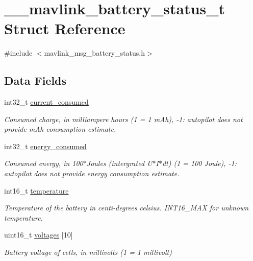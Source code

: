 \hypertarget{struct____mavlink__battery__status__t}{\section{\+\_\+\+\_\+mavlink\+\_\+battery\+\_\+status\+\_\+t Struct Reference}
\label{struct____mavlink__battery__status__t}
}


{\ttfamily \#include $<$mavlink\+\_\+msg\+\_\+battery\+\_\+status.\+h$>$}

\subsection*{Data Fields}
\begin{DoxyCompactItemize}
\item 
int32\+\_\+t \hyperlink{struct____mavlink__battery__status__t_ac1a47c138e4bc2bb4788dce4f09016ff}{current\+\_\+consumed}
\begin{DoxyCompactList}\small\item\em Consumed charge, in milliampere hours (1 = 1 m\+Ah), -\/1\+: autopilot does not provide m\+Ah consumption estimate. \end{DoxyCompactList}\item 
int32\+\_\+t \hyperlink{struct____mavlink__battery__status__t_a533f5606ec2f20a4ac4ff74b2e81f3b8}{energy\+\_\+consumed}
\begin{DoxyCompactList}\small\item\em Consumed energy, in 100$\ast$\+Joules (intergrated U$\ast$\+I$\ast$dt) (1 = 100 Joule), -\/1\+: autopilot does not provide energy consumption estimate. \end{DoxyCompactList}\item 
int16\+\_\+t \hyperlink{struct____mavlink__battery__status__t_a201acfc9b1f55193779a17fe758b88a6}{temperature}
\begin{DoxyCompactList}\small\item\em Temperature of the battery in centi-\/degrees celsius. I\+N\+T16\+\_\+\+M\+A\+X for unknown temperature. \end{DoxyCompactList}\item 
uint16\+\_\+t \hyperlink{struct____mavlink__battery__status__t_a81813055c78457f14d966fbf2c90c11a}{voltages} \mbox{[}10\mbox{]}
\begin{DoxyCompactList}\small\item\em Battery voltage of cells, in millivolts (1 = 1 millivolt) \end{DoxyCompactList}\item 

\end{DoxyCompactItemize}
